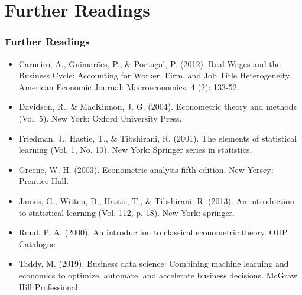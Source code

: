 \documentclass[
  shownotes,
  xcolor={svgnames},
  hyperref={colorlinks,citecolor=DarkBlue,linkcolor=DarkRed,urlcolor=DarkBlue}
  , aspectratio=169]{beamer}
\begin{document}
\section{Further Readings}
\begin{frame}
\frametitle{Further Readings}
\footnotesize
\begin{itemize}
  \item Carneiro, A., Guimarães, P., \& Portugal, P. (2012). Real Wages and the Business Cycle: Accounting for Worker, Firm, and Job Title Heterogeneity. American Economic Journal: Macroeconomics, 4 (2): 133-52. 
  \medskip
  \item Davidson, R., \& MacKinnon, J. G. (2004). Econometric theory and methods (Vol. 5). New York: Oxford University Press.
  \medskip
  \item Friedman, J., Hastie, T., \& Tibshirani, R. (2001). The elements of statistical learning (Vol. 1, No. 10). New York: Springer series in statistics.
  \medskip
  \item Greene, W. H. (2003). Econometric analysis fifth edition. New Yersey: Prentice Hall.
  \medskip
  \item James, G., Witten, D., Hastie, T., \& Tibshirani, R. (2013). An introduction to statistical learning (Vol. 112, p. 18). New York: springer.
  \medskip
  \item Ruud, P. A. (2000). An introduction to classical econometric theory. OUP Catalogue
  \medskip
  \item Taddy, M. (2019). Business data science: Combining machine learning and economics to optimize, automate, and accelerate business decisions. McGraw Hill Professional.


\end{itemize}

\end{frame}
\end{document}
